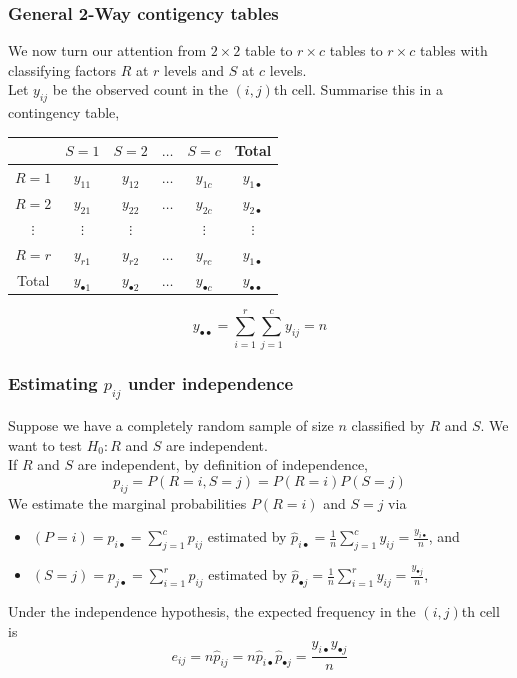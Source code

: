 \documentclass[a4paper]{article}\usepackage[]{graphicx}\usepackage[]{xcolor}
\begin{document}
\subsubsection{General 2-Way contigency tables}
We now turn our attention from \( 2 \times 2 \) table to \( r \times c \) tables to \( r \times c \) tables with classifying factors \( R \) at \( r \) levels and \( S \) at \( c \) levels.\\
Let \( y_{ij} \) be the observed count in the \( (i,j) \)th cell. 
Summarise this in a contingency table,
\begin{table}[H]
	\centering
	\begin{tabular}{@{}ccccc|c@{}}
	\toprule
				 & \( S = 1 \)   		& \( S = 2 \)   	  & \( \dots \) & \( S = c \)  		  & Total		             \\ \midrule
	\( R = 1 \)  & \( y_{11} \) 		& \( y_{12} \) 		  & \( \dots \) & \( y_{1c} \)        & \( y_{1 \bullet} \)      \\
	\( R = 2 \)  & \( y_{21} \) 		& \( y_{22} \) 		  & \( \dots \) & \( y_{2c} \)        & \( y_{2 \bullet} \)      \\ 
	\( \vdots \) & \( \vdots \) 		& \( \vdots \) 		  &             & \( \vdots \)        & \( \vdots \) 	         \\ 
	\( R = r \)  & \( y_{r1} \) 		& \( y_{r2} \) 		  & \( \dots \) & \( y_{rc} \)        & \( y_{1 \bullet} \)      \\ \midrule
	Total 		 & \( y_{\bullet 1} \)  & \( y_{\bullet 2} \) & \( \dots \) & \( y_{\bullet c} \) & \( y_{\bullet\bullet} \) \\ \bottomrule
	\end{tabular}
\end{table}
\[
	y_{\bullet\bullet} = \sum_{i=1}^{r} \sum_{j=1}^{c} y_{ij} = n
\]
\subsubsection{Estimating \( p_{ij} \) under independence}
Suppose we have a completely random sample of size \( n \) classified by \( R \) and \( S \). We want to test \( H_0: R \) and \( S \) are independent.\\
If \( R \) and \( S \) are independent, by definition of independence,
\[
	p_{ij} = P(R = i, S = j) = P(R = i)P(S = j)
\]
We estimate the marginal probabilities \( P(R = i) \) and \( S = j \) via
\begin{itemize}
	\item \( (P = i) = p_{i \bullet} = \sum\limits_{j=1}^{c} p_{ij} \) estimated by \( \hat{p}_{i \bullet} = \frac{1}{n}\sum\limits_{j=1}^{c} y_{ij} = \frac{y_{i \bullet}}{n} \), and 
	\item \( (S = j) = p_{j \bullet} = \sum\limits_{i=1}^{r} p_{ij} \) estimated by \( \hat{p}_{\bullet j} = \frac{1}{n}\sum\limits_{i=1}^{r} y_{ij} = \frac{y_{\bullet j}}{n} \),
\end{itemize}
Under the independence hypothesis, the expected frequency in the  \( (i,j) \)th cell is
\[
	e_{ij} = n \hat{p}_{ij} = n \hat{p}_{i \bullet}\hat{p}_{\bullet j} = \frac{y_{i \bullet}y_{\bullet j}}{n}
\]
\end{document}
